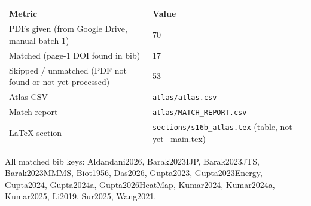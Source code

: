 \documentclass[12pt,a4paper]{article}
\begin{document}
\begin{tabularx}{\textwidth}{@{}lX@{}}
\toprule
\textbf{Metric} & \textbf{Value} \\
\midrule
PDFs given (from Google Drive, manual batch 1) & 70 \\
Matched (page-1 DOI found in bib) & 17 \\
Skipped / unmatched (PDF not found or not yet processed) & 53 \\
Atlas CSV & {\tt atlas/atlas.csv} \\
Match report & {\tt atlas/MATCH\_REPORT.csv} \\
LaTeX section & {\tt sections/s16b\_atlas.tex} (table, not yet \ main.tex) \\
\midrule
\end{tabularx}

All matched bib keys: Aldandani2026, Barak2023IJP, Barak2023JTS, Barak2023MMMS, Biot1956, Das2026, Gupta2023, Gupta2023Energy, Gupta2024, Gupta2024a, Gupta2026HeatMap, Kumar2024, Kumar2024a, Kumar2025, Li2019, Sur2025, Wang2021.
\end{document}
